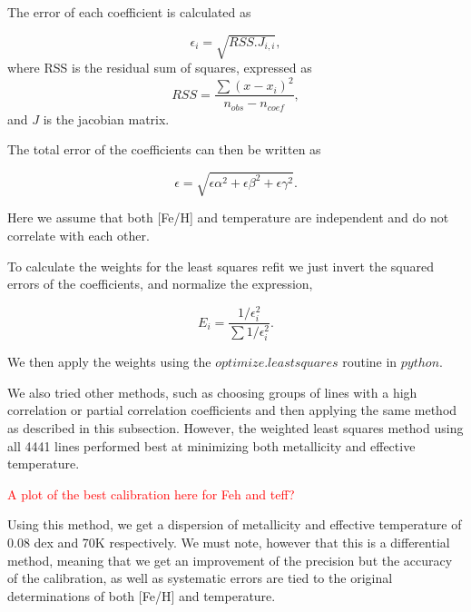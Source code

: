 \documentclass[structabstract]{aa}
\begin{document}
The error of each coefficient is calculated as

\begin{equation}
\epsilon_{i} = \sqrt{RSS.J_{i,i}},
\end{equation}
where RSS is the residual sum of squares, expressed as
\begin{equation}
RSS = \frac{\sum{(x-x_{i})^{2}}}{n_{obs}-n_{coef}},
\end{equation}
and $J$ is the jacobian matrix. 

The total error of the coefficients can then be written as 

\begin{equation} 
\epsilon = \sqrt{\epsilon\alpha^{2}+\epsilon\beta^{2}+\epsilon\gamma^{2}}.
\end{equation}

Here we assume that both [Fe/H] and temperature are independent and do not correlate with each other. 

To calculate the weights for the least squares refit we just invert the squared errors of the coefficients, and normalize the expression,

\begin{equation}
E_{i} = \frac{1/\epsilon_{i}^{2}}{\sum{1/\epsilon_{i}^{2}}}.
\end{equation}

We then apply the weights using the $optimize.least squares$ routine in $python$. 

We also tried other methods, such as choosing groups of lines with a high correlation or partial correlation coefficients and then applying the same method as described in this subsection. However, the weighted least squares method using all 4441 lines performed best at minimizing both metallicity and effective temperature. 

\textcolor{red}{A plot of the best calibration here for Feh and teff?}

Using this method, we get a dispersion of metallicity and effective temperature of 0.08 dex and 70K respectively. We must note, however that this is a differential method, meaning that we get an improvement of the precision but the accuracy of the calibration, as well as systematic errors are tied to the original determinations of both [Fe/H] and temperature. 
\end{document}

